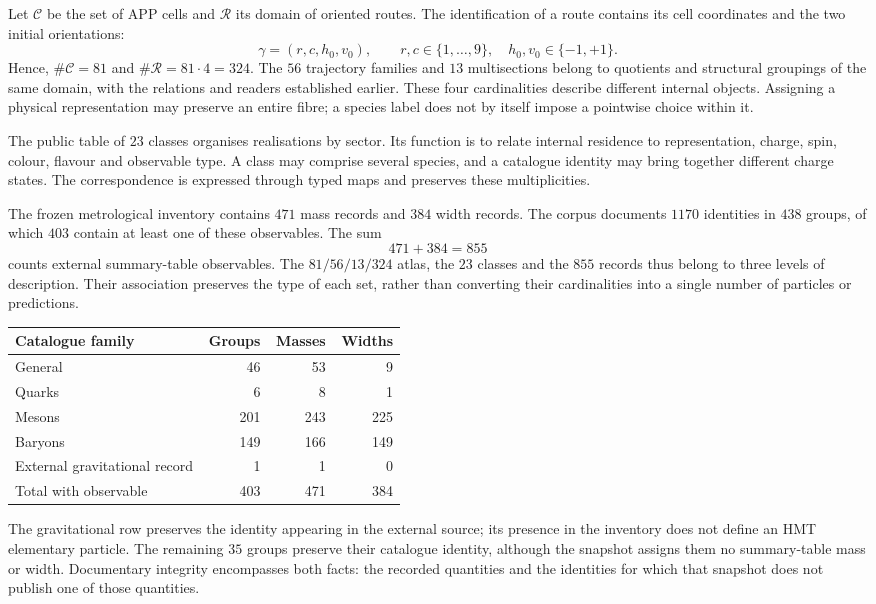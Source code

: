 Let \(\mathcal C\) be the set of APP cells and \(\mathcal R\) its domain
of oriented routes. The identification of a route contains its cell
coordinates and the two initial orientations:
\[
 \gamma=(r,c,h_0,v_0),\qquad
 r,c\in\{1,\ldots,9\},\quad h_0,v_0\in\{-1,+1\}.
\]
Hence, \(\#\mathcal C=81\) and \(\#\mathcal R=81\cdot4=324\).
The \(56\) trajectory families and \(13\) multisections belong
to quotients and structural groupings of the same domain, with the
relations and readers established earlier. These four cardinalities
describe different internal objects. Assigning a physical
representation may preserve an entire fibre; a species label does not
by itself impose a pointwise choice within it.

The public table of \(23\) classes organises realisations by sector.
Its function is to relate internal residence to representation,
charge, spin, colour, flavour and observable type. A class may
comprise several species, and a catalogue identity may bring together
different charge states. The correspondence is expressed through
typed maps and preserves these multiplicities.

The frozen metrological inventory contains \(471\) mass records and
\(384\) width records. The corpus documents \(1170\) identities in \(438\)
groups, of which \(403\) contain at least one of these observables.
The sum
\[
 471+384=855
\]
counts external summary-table observables. The \(81/56/13/324\) atlas,
the \(23\) classes and the \(855\) records thus belong to three levels
of description. Their association preserves the type of each set, rather
than converting their cardinalities into a single number of particles or predictions.

\begin{center}
\begin{tabular}{p{0.49\linewidth}rrr}
\toprule
Catalogue family & Groups & Masses & Widths\\
\midrule
General & 46 & 53 & 9\\
Quarks & 6 & 8 & 1\\
Mesons & 201 & 243 & 225\\
Baryons & 149 & 166 & 149\\
External gravitational record & 1 & 1 & 0\\
\midrule
Total with observable & 403 & 471 & 384\\
\bottomrule
\end{tabular}
\end{center}

The gravitational row preserves the identity appearing in the external source;
its presence in the inventory does not define an HMT elementary particle.
The remaining \(35\) groups preserve their catalogue identity, although
the snapshot assigns them no summary-table mass or width. Documentary
integrity encompasses both facts: the recorded quantities and the identities
for which that snapshot does not publish one of those quantities.

